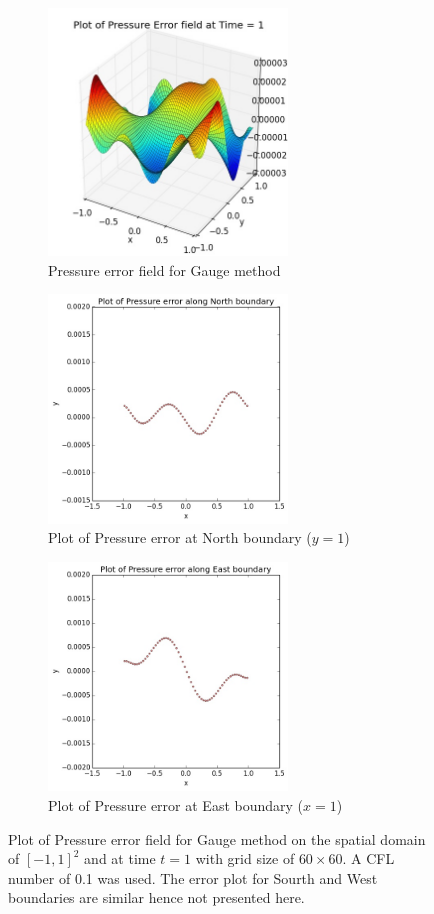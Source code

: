 \begin{figure}[H]
	\centering
	\begin{subfigure}[t]{2.5in}
		\centering
		\includegraphics[width=2.5in]{figures/Gauge_pf2_P_error_t_1_grid_60.jpg}
		\caption{Pressure error field for Gauge method}\label{fig:6.12a}		
	\end{subfigure}
	\quad
	\begin{subfigure}[t]{2.5in}
		\centering
		\includegraphics[width=2.5in]{figures/Gauge_pf2_N_P_error_t_1_grid_60.jpg}
		\caption{Plot of Pressure error at North boundary ($y=1$)}\label{fig:6.12b}
	\end{subfigure}
	\quad
	\begin{subfigure}[t]{2.5in}
		\centering
		\includegraphics[width=2.5in]{figures/Gauge_pf2_E_P_error_t_1_grid_60.jpg}
		\caption{Plot of Pressure error at East boundary ($x=1$)}\label{fig:6.12c}
	\end{subfigure}
	\caption{Plot of Pressure error field for Gauge method on the spatial domain of $[-1,1]^2$ and at time $t=1$ with grid size of $60 \times 60$. A CFL number of 0.1 was used. The error plot for Sourth and West boundaries are similar hence not presented here.}\label{fig:6.12}
\end{figure}

